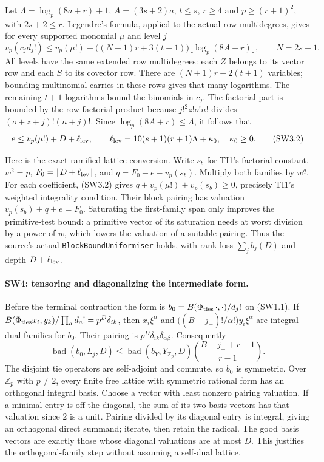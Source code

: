 \documentclass[11pt,a4paper]{article}
\numberwithin{equation}{section}
\theoremstyle{remark}\newtheorem{remark}[theorem]{Remark}
\begin{document}
Let $\Lambda=\log_p(8a+r)+1$, $A=(3s+2)a$, $t\le s$, $r\ge4$ and
$p\ge(r+1)^2$, with $2s+2\le r$. Legendre's formula, applied to the
actual row multidegrees, gives for every supported monomial $\mu$ and level $j$
\[
 v_p(c_jd_j!)\le v_p(\mu!)+
       \big((N+1)r+3(t+1)\big)\lfloor\log_p(8A+r)\rfloor,
 \qquad N=2s+1.
 \tag{SW3.1}
\]
All levels have the same extended row multidegrees: each $Z$ belongs to
its vector row and each $S$ to its covector row. There are
$(N+1)r+2(t+1)$ variables; bounding multinomial carries in these rows
gives that many logarithms. The remaining $t+1$ logarithms bound the
binomials in $c_j$. The factorial part is bounded by the row factorial
product because $j!^2z!o!n!$ divides $(o+z+j)!(n+j)!$.
Since $\log_p(8A+r)\le\Lambda$, it follows that
\[
 e\le v_p(\mu!)+D+\ell_{\rm lev},\qquad
 \ell_{\rm lev}=10(s+1)(r+1)\Lambda+\kappa_0,\quad \kappa_0\ge0.
 \tag{SW3.2}
\]

Here is the exact ramified-lattice conversion. Write $s_b$ for TI1's
factorial constant, $w^2=p$, $F_0=\lfloor D+\ell_{\rm lev}\rfloor$, and
$q=F_0-e-v_p(s_b)$. Multiply both families by $w^q$.
For each coefficient, (SW3.2) gives
$q+v_p(\mu!)+v_p(s_b)\ge0$, precisely TI1's weighted integrality condition.
Their block pairing has valuation
$v_p(s_b)+q+e=F_0$. Saturating the first-family span only improves the
primitive-test bound: a primitive vector of its saturation needs at
worst division by a power of $w$, which lowers the valuation of a suitable
pairing. Thus the source's actual \texttt{BlockBoundUniformiser} holds,
with rank loss $\sum_jb_j(D)$ and depth $D+\ell_{\rm lev}$.

\paragraph{SW4: tensoring and diagonalizing the intermediate form.}
Before the terminal contraction the form is
$b_0=B(\Phi_{\rm ties}\,\cdot,\cdot)/d_j!$ on (SW1.1).
If $B(\Phi_{\rm ties}x_i,y_k)/\prod_a d_a!=p^D\delta_{ik}$,
then
$x_i\xi^\alpha$ and
$\big((B-j_+)!/\alpha!\big)y_i\xi^\alpha$
are integral dual families for $b_0$.
Their pairing is $p^D\delta_{ik}\delta_{\alpha\beta}$.
Consequently
\[
 \operatorname{bad}(b_0,L_j,D)
 \le\operatorname{bad}(b_Y,Y_{\mathbb Z_p},D)
          \binom{B-j_++r-1}{r-1}.
 \tag{SW4.1}
\]
The disjoint tie operators are self-adjoint and commute, so $b_0$ is
symmetric. Over $\mathbb Z_p$ with $p\ne2$, every finite free lattice
with symmetric rational form has an orthogonal integral basis.
Choose a vector with least nonzero pairing valuation. If a minimal
entry is off the diagonal, the sum of its two basis vectors has that
valuation since $2$ is a unit. Pairing divided by its diagonal entry is
integral, giving an orthogonal direct summand; iterate, then retain the
radical. The good basis vectors are exactly those whose diagonal
valuations are at most $D$. This justifies the orthogonal-family step
without assuming a self-dual lattice.
\end{document}
